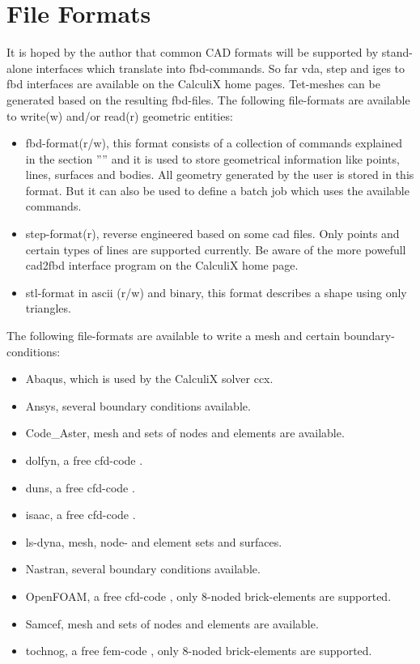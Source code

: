 \documentclass{article}
\begin{document}
\section{\label{File Formats}File Formats}
It is hoped by the author that common CAD formats will be supported by stand-alone interfaces which translate into fbd-commands. So far vda, step and iges to fbd interfaces are available on the CalculiX home pages. Tet-meshes can be generated based on the resulting fbd-files. The following file-formats are available to write(w) and/or read(r) geometric entities:
\begin{itemize}
\item fbd-format(r/w), this format consists of a collection of commands explained in the section '''' and it is used to store geometrical information like points, lines, surfaces and bodies. All geometry generated by the user is stored in this format. But it can also be used to define a batch job which uses the available commands.
\item step-format(r), reverse engineered based on some cad files. Only points and certain types of lines are supported currently. Be aware of the more powefull cad2fbd interface program on the CalculiX home page.
\item stl-format in ascii (r/w) and binary, this format describes a shape using only triangles.
\end{itemize}
The following file-formats are available to write a mesh and certain boundary-conditions:
\begin{itemize}
\item Abaqus, which is used by the CalculiX solver ccx.
\item Ansys, several boundary conditions available.
\item Code\_Aster, mesh and sets of nodes and elements are available.
\item dolfyn, a free cfd-code \cite{dolfyn}.
\item duns, a free cfd-code \cite{duns}.
\item isaac, a free cfd-code \cite{isaac}.
\item ls-dyna, mesh, node- and element sets and surfaces.
\item Nastran, several boundary conditions available.
\item OpenFOAM, a free cfd-code \cite{OpenFOAM}, only 8-noded brick-elements are supported.
\item Samcef, mesh and sets of nodes and elements are available.
\item tochnog, a free fem-code \cite{tochnog}, only 8-noded brick-elements are supported.
\end{itemize}
\end{document}
